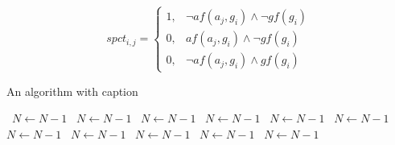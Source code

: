 \documentclass[a4paper]{article}
\begin{document}
\begin{equation}
spct_{i,j} =
\begin{cases}
1, & \text{$\neg af(a_j,g_i) \wedge \neg gf(g_i)$}\\
0, & \text{$af(a_j,g_i) \wedge \neg gf(g_i)$}\\
0, & \text{$\neg af(a_j,g_i) \wedge gf(g_i)$}
\end{cases}
\end{equation}

\begin{algorithm}
\caption{An algorithm with caption}
\begin{algorithmic}
\    \State $N \gets N - 1$
\    \State $N \gets N - 1$
\    \State $N \gets N - 1$
\    \State $N \gets N - 1$
\    \State $N \gets N - 1$
\    \State $N \gets N - 1$
\    \State $N \gets N - 1$
\    \State $N \gets N - 1$
\    \State $N \gets N - 1$
\    \State $N \gets N - 1$
\    \State $N \gets N - 1$
\EndWhile
\end{algorithmic}
\end{algorithm}
\end{document}
